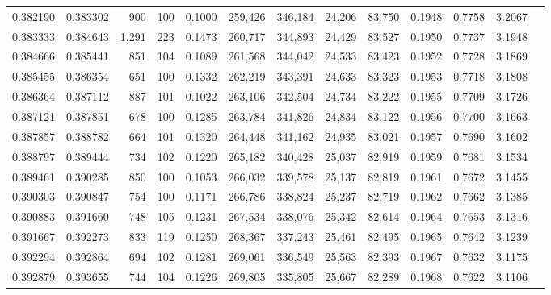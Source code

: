 \begin{tabular}{rrrrrrrrrrrrr}
0.382190 & 0.383302 &    900 &   100 &                                     0.1000 & 259,426 & 346,184 &  24,206 &  83,750 & 0.1948 & 0.7758 & 3.2067 \\
0.383333 & 0.384643 &  1,291 &   223 &                                     0.1473 & 260,717 & 344,893 &  24,429 &  83,527 & 0.1950 & 0.7737 & 3.1948 \\
0.384666 & 0.385441 &    851 &   104 &                                     0.1089 & 261,568 & 344,042 &  24,533 &  83,423 & 0.1952 & 0.7728 & 3.1869 \\
0.385455 & 0.386354 &    651 &   100 &                                     0.1332 & 262,219 & 343,391 &  24,633 &  83,323 & 0.1953 & 0.7718 & 3.1808 \\
0.386364 & 0.387112 &    887 &   101 &                                     0.1022 & 263,106 & 342,504 &  24,734 &  83,222 & 0.1955 & 0.7709 & 3.1726 \\
0.387121 & 0.387851 &    678 &   100 &                                     0.1285 & 263,784 & 341,826 &  24,834 &  83,122 & 0.1956 & 0.7700 & 3.1663 \\
0.387857 & 0.388782 &    664 &   101 &                                     0.1320 & 264,448 & 341,162 &  24,935 &  83,021 & 0.1957 & 0.7690 & 3.1602 \\
0.388797 & 0.389444 &    734 &   102 &                                     0.1220 & 265,182 & 340,428 &  25,037 &  82,919 & 0.1959 & 0.7681 & 3.1534 \\
0.389461 & 0.390285 &    850 &   100 &                                     0.1053 & 266,032 & 339,578 &  25,137 &  82,819 & 0.1961 & 0.7672 & 3.1455 \\
0.390303 & 0.390847 &    754 &   100 &                                     0.1171 & 266,786 & 338,824 &  25,237 &  82,719 & 0.1962 & 0.7662 & 3.1385 \\
0.390883 & 0.391660 &    748 &   105 &                                     0.1231 & 267,534 & 338,076 &  25,342 &  82,614 & 0.1964 & 0.7653 & 3.1316 \\
0.391667 & 0.392273 &    833 &   119 &                                     0.1250 & 268,367 & 337,243 &  25,461 &  82,495 & 0.1965 & 0.7642 & 3.1239 \\
0.392294 & 0.392864 &    694 &   102 &                                     0.1281 & 269,061 & 336,549 &  25,563 &  82,393 & 0.1967 & 0.7632 & 3.1175 \\
0.392879 & 0.393655 &    744 &   104 &                                     0.1226 & 269,805 & 335,805 &  25,667 &  82,289 & 0.1968 & 0.7622 & 3.1106 \\

\end{tabular}
